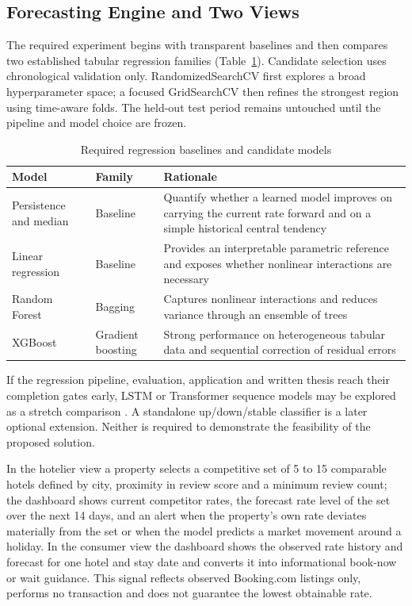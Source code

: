 \subsection{Forecasting Engine and Two Views}

The required experiment begins with transparent baselines and then compares two established tabular regression families (Table~\ref{tab:models}). Candidate selection uses chronological validation only. RandomizedSearchCV first explores a broad hyperparameter space; a focused GridSearchCV then refines the strongest region using time-aware folds. The held-out test period remains untouched until the pipeline and model choice are frozen.

\begin{table}[!htbp]
\centering
\caption{Required regression baselines and candidate models}
\label{tab:models}
\begin{tabular}{|p{2.8cm}|p{2.8cm}|p{7.8cm}|}
\hline
\textbf{Model} & \textbf{Family} & \textbf{Rationale} \\
\hline
Persistence and median & Baseline & Quantify whether a learned model improves on carrying the current rate forward and on a simple historical central tendency \\
\hline
Linear regression & Baseline & Provides an interpretable parametric reference and exposes whether nonlinear interactions are necessary \\
\hline
Random Forest & Bagging & Captures nonlinear interactions and reduces variance through an ensemble of trees \citep{breiman2001} \\
\hline
XGBoost & Gradient boosting & Strong performance on heterogeneous tabular data and sequential correction of residual errors \citep{chen2016, grinsztajn2022} \\
\hline
\end{tabular}
\end{table}

If the regression pipeline, evaluation, application and written thesis reach their completion gates early, LSTM or Transformer sequence models may be explored as a stretch comparison \citep{hochreiter1997, vaswani2017, zeng2023}. A standalone up/down/stable classifier is a later optional extension. Neither is required to demonstrate the feasibility of the proposed solution.

In the hotelier view a property selects a competitive set of 5 to 15 comparable hotels defined by city, proximity in review score and a minimum review count; the dashboard shows current competitor rates, the forecast rate level of the set over the next 14 days, and an alert when the property's own rate deviates materially from the set or when the model predicts a market movement around a holiday. In the consumer view the dashboard shows the observed rate history and forecast for one hotel and stay date and converts it into informational book-now or wait guidance. This signal reflects observed Booking.com listings only, performs no transaction and does not guarantee the lowest obtainable rate.

